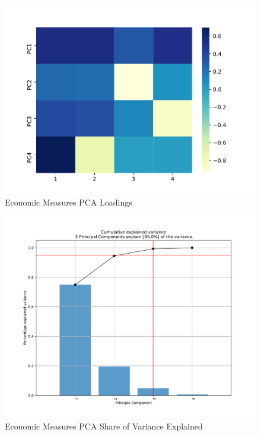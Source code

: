 \documentclass{report}
\begin{document}
	\begin{figure}[h!]
		\centering
		\caption{Economic Measures PCA Loadings}
		\label{Econ_Loadings}	
		\includegraphics[width=\linewidth,keepaspectratio=true]{../Output/Figures/GDP_LE_Loadings.pdf}
	\end{figure}

	\begin{figure}[h!]
		\centering
		\caption{Economic Measures PCA Share of Variance Explained}
		\label{Econ_Share_Explained}	
		\includegraphics[width=\linewidth,keepaspectratio=true]{../Output/Figures/GDP_LE_Share_Explained.pdf}
	\end{figure}
\end{document}
